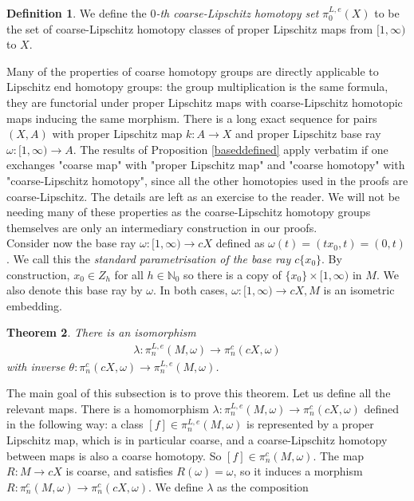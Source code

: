 \documentclass[a4paper,11pt]{article}
\theoremstyle{definition}
\newtheorem{definition}{Definition}[section]
\theoremstyle{plain}
\newtheorem{theorem}[definition]{Theorem}
\theoremstyle{remark}
\begin{document}
{\begin{definition}
 We define the \textit{$0$-th coarse-Lipschitz homotopy set} $\pi_0^{L,e}(X)$ to be the set of coarse-Lipschitz homotopy classes of proper Lipschitz maps from $[1,\infty)$ to $X$.
\end{definition}

Many of the properties of coarse homotopy groups are directly applicable to Lipschitz end homotopy groups: the group multiplication is the same formula, they are functorial under proper Lipschitz maps with coarse-Lipschitz homotopic maps inducing the same morphism. There is a long exact sequence for pairs $(X,A)$ with proper Lipschitz map $k: A \rightarrow X$ and proper Lipschitz base ray $\omega:[1,\infty) \rightarrow A$. The results of Proposition \ref{baseddefined} apply verbatim if one exchanges "coarse map" with "proper Lipschitz map" and "coarse homotopy" with "coarse-Lipschitz homotopy", since all the other homotopies used in the proofs are coarse-Lipschitz. The details are left as an exercise to the reader. We will not be needing many of these properties as the coarse-Lipschitz homotopy groups themselves are only an intermediary construction in our proofs. \\

Consider now the base ray $\omega: [1,\infty)\rightarrow cX$ defined as $\omega(t)=(tx_0,t) = (0,t)$. We call this the \textit{standard parametrisation of the base ray $c\{x_0\}$}. By construction, $x_0\in Z_{h}$ for all $h\in \mathbb{N}_{0}$ so there is a copy of $\{x_0\} \times [1,\infty) $ in $M$. We also denote this base ray by $\omega$. In both cases, $\omega: [1,\infty)\rightarrow cX,M$ is an isometric embedding.  

\begin{theorem} \label{isoomega}There is an isomorphism  
\begin{align*}
\lambda:  \pi_{n}^{L,e}(M,\omega)\rightarrow \pi_{n}^c(cX,\omega) 
\end{align*} 
with inverse $\theta:  \pi_{n}^c(cX,\omega)\rightarrow  \pi_{n}^{L,e}(M,\omega)$. 
\end{theorem}

The main goal of this subsection is to prove this theorem. Let us define all the relevant maps. There is a homomorphism $\lambda: \pi_{n}^{L,e}(M,\omega) \rightarrow \pi_{n}^c(cX,\omega)$ defined in the following way: a class $[f]\in  \pi_{n}^{L,e}(M,\omega)$ is represented by a proper Lipschitz map, which is in particular coarse, and a coarse-Lipschitz homotopy between maps is also a coarse homotopy. So $[f]\in \pi_{n}^{c}(M,\omega)$. The map $R: M\rightarrow cX$ is coarse, and satisfies $R(\omega)=\omega$, so it induces a morphism $R: \pi_n^c(M,\omega)\rightarrow \pi_{n}^c(cX,\omega)$. We define $\lambda$ as the composition 

}
\end{document}
